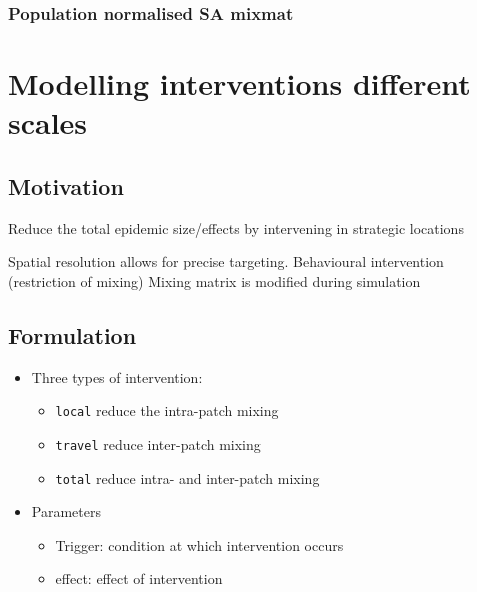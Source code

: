 \documentclass[
  letterpaper,
  DIV=11,
  numbers=noendperiod]{scrreprt}
\begin{document}
\hypertarget{population-normalised-sa-mixmat}{%
\subsection{Population normalised SA
mixmat}\label{population-normalised-sa-mixmat}}

\hypertarget{modelling-interventions-different-scales}{%
\chapter{Modelling interventions different
scales}\label{modelling-interventions-different-scales}}

\hypertarget{motivation-1}{%
\section{Motivation}\label{motivation-1}}

Reduce the total epidemic size/effects by intervening in strategic
locations

Spatial resolution allows for precise targeting. Behavioural
intervention (restriction of mixing) Mixing matrix is modified during
simulation

\hypertarget{formulation-1}{%
\section{Formulation}\label{formulation-1}}

\begin{itemize}
\item
  Three types of intervention:

  \begin{itemize}
  \item
    \texttt{local} reduce the intra-patch mixing
  \item
    \texttt{travel} reduce inter-patch mixing
  \item
    \texttt{total} reduce intra- and inter-patch mixing
  \end{itemize}
\item
  Parameters

  \begin{itemize}
  \item
    Trigger: condition at which intervention occurs
  \item
    effect: effect of intervention
  \end{itemize}
\end{itemize}
\end{document}
